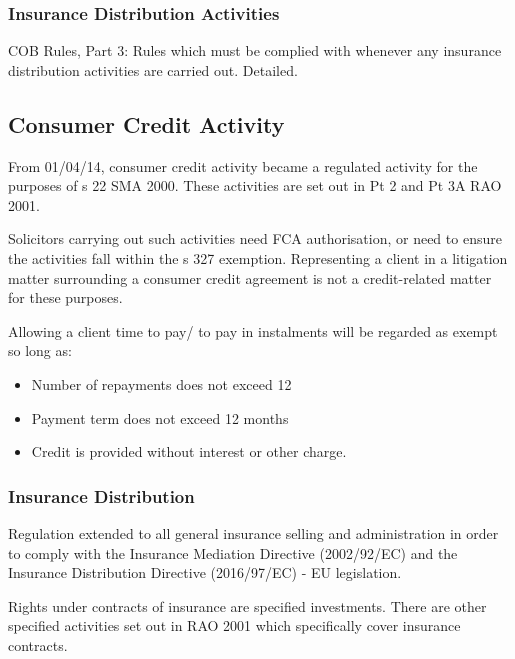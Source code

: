 \documentclass[
]{article}
\providecommand{\tightlist}{%
  \setlength{\itemsep}{0pt}\setlength{\parskip}{0pt}}
\begin{document}
\hypertarget{insurance-distribution-activities}{%
\subsubsection{Insurance Distribution
Activities}\label{insurance-distribution-activities}}

COB Rules, Part 3: Rules which must be complied with whenever any
insurance distribution activities are carried out. Detailed.

\hypertarget{consumer-credit-activity}{%
\subsection{Consumer Credit Activity}\label{consumer-credit-activity}}

From 01/04/14, consumer credit activity became a regulated activity for
the purposes of s 22 SMA 2000. These activities are set out in Pt 2 and
Pt 3A RAO 2001.

Solicitors carrying out such activities need FCA authorisation, or need
to ensure the activities fall within the s 327 exemption. Representing a
client in a litigation matter surrounding a consumer credit agreement is
not a credit-related matter for these purposes.

Allowing a client time to pay/ to pay in instalments will be regarded as
exempt so long as:

\begin{itemize}
\tightlist
\item
  Number of repayments does not exceed 12
\item
  Payment term does not exceed 12 months
\item
  Credit is provided without interest or other charge.
\end{itemize}

\hypertarget{insurance-distribution}{%
\subsubsection{Insurance Distribution}\label{insurance-distribution}}

Regulation extended to all general insurance selling and administration
in order to comply with the Insurance Mediation Directive (2002/92/EC)
and the Insurance Distribution Directive (2016/97/EC) - EU legislation.

Rights under contracts of insurance are specified investments. There are
other specified activities set out in RAO 2001 which specifically cover
insurance contracts.
\end{document}
